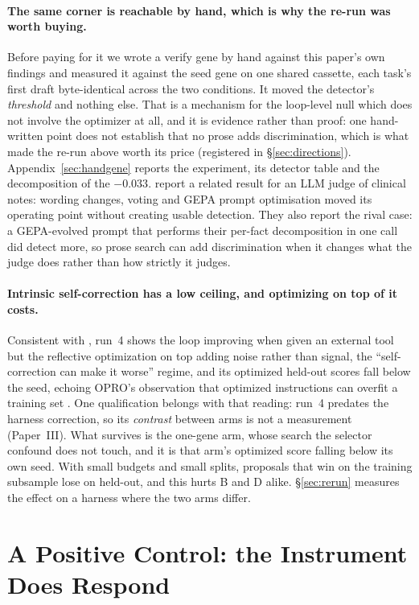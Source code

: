 \documentclass[11pt]{article}
\begin{document}
\paragraph{The same corner is reachable by hand, which is why the re-run was worth buying.}
Before paying for it we wrote a verify gene by hand against this paper's own findings and measured
it against the seed gene on one shared cassette, each task's first draft byte-identical across the
two conditions. It moved the detector's \emph{threshold} and nothing else. That is a mechanism for
the loop-level null which does not involve the optimizer at all, and it is evidence rather than
proof: one hand-written point does not establish that no prose adds discrimination, which is what
made the re-run above worth its price (registered in \S\ref{sec:directions}).
Appendix~\ref{sec:handgene} reports the experiment, its detector table and the decomposition of
the $-0.033$. \citet{fox2026omission} report a related result for an LLM judge of clinical notes: wording
changes, voting and GEPA prompt optimisation moved its operating point without creating usable
detection. They also report the rival case: a GEPA-evolved prompt that performs their per-fact
decomposition in one call did detect more, so prose search can add discrimination when it changes
what the judge does rather than how strictly it judges.

\paragraph{Intrinsic self-correction has a low ceiling, and optimizing on top of it
costs.} Consistent with \citet{huang2023cannot}, run~4 shows the loop improving when given an
external tool but the reflective optimization on top adding noise rather than signal, the
``self-correction can make it worse'' regime, and its optimized held-out scores fall below
the seed, echoing OPRO's observation that optimized instructions can overfit a training set
\citep{yang2023opro}. One qualification belongs with that reading: run~4 predates the harness
correction, so its \emph{contrast} between arms is not a measurement (Paper~III). What survives is
the one-gene arm, whose search the selector confound does not touch, and it is that arm's
optimized score falling below its own seed. With small budgets and small splits, proposals that win on the training
subsample lose on held-out, and this hurts B and D alike. \S\ref{sec:rerun} measures the
effect on a harness where the two arms differ.

\section{A Positive Control: the Instrument Does Respond}
\label{sec:posctrl}
\end{document}
